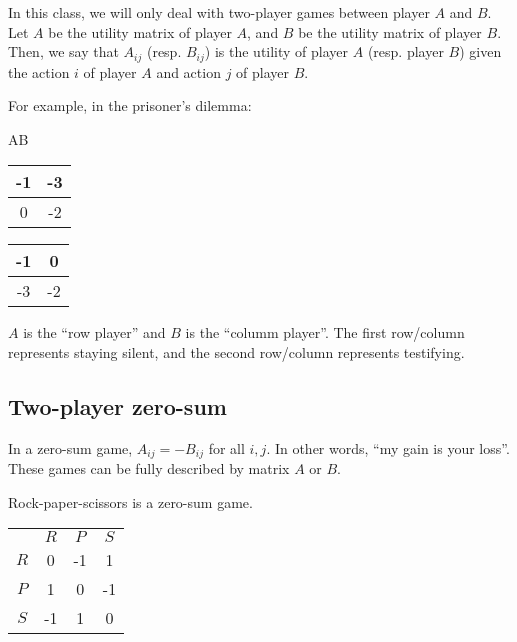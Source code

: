 \begin{definition}

In this class, we will only deal with two-player games between player $A$ and $B$. Let $A$ be the utility matrix of player $A$, and $B$ be the utility matrix of player $B$. Then, we say that $A_{ij}$ (resp. $B_{ij}$) is the utility of player $A$ (resp. player $B$) given the action $i$ of player $A$ and action $j$ of player $B$. 
\end{definition}
For example, in the prisoner's dilemma: 
\begin{center}
A\hspace{2.2cm}B\medskip

\begin{tabular}{|c|c|}
\hline
    -1 & -3 \\
\hline
    0 & -2 \\
\hline
\end{tabular}\hspace{1cm}\begin{tabular}{|c|c|}
\hline
    -1 & 0 \\
\hline
    -3 & -2 \\
\hline
\end{tabular}
\end{center}
$A$ is the ``row player'' and $B$ is the ``columm player''. The first row/column represents staying silent, and the second row/column represents testifying. 

\subsection{Two-player zero-sum}

In a \ac{zero-sum} game, $A_{ij}=-B_{ij}$ for all $i,j$. In other words, ``my gain is your loss''. These games can be fully described by matrix $A$ or $B$. 

\begin{example}
\exlabel

Rock-paper-scissors is a zero-sum game. 
\end{example}

\begin{center}
\begin{tabular}{c|c|c|c|}
 \multicolumn{1}{c}{} & \multicolumn{1}{c}{$R$} & \multicolumn{1}{c}{$P$} & \multicolumn{1}{c}{$S$} \\
\cline{2-4}
    $R$ & 0 & -1 & 1 \\
\cline{2-4}
    $P$ & 1 & 0 & -1 \\
\cline{2-4}
    $S$ & -1 & 1 & 0 \\
\cline{2-4}
\end{tabular}
\end{center}

